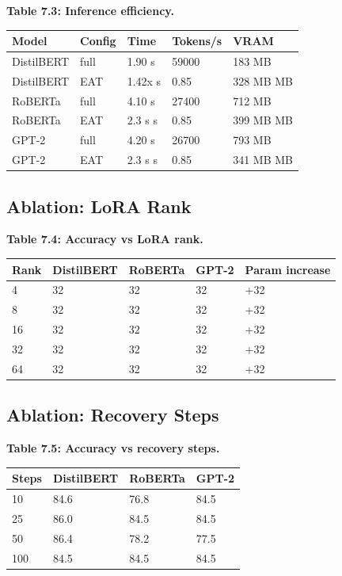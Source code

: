 \textbf{Table 7.3: Inference efficiency.}

\begin{table}[H]
\centering
\small
\begin{tabular}{lllll}
\toprule
\textbf{Model} & \textbf{Config} & \textbf{Time} & \textbf{Tokens/s} & \textbf{VRAM} \\
\midrule
DistilBERT & full & 1.90 s & 59000 & 183 MB \\
DistilBERT & EAT & 1.42x s & 0.85 & 328 MB MB \\
RoBERTa & full & 4.10 s & 27400 & 712 MB \\
RoBERTa & EAT & 2.3 s s & 0.85 & 399 MB MB \\
GPT-2 & full & 4.20 s & 26700 & 793 MB \\
GPT-2 & EAT & 2.3 s s & 0.85 & 341 MB MB \\
\bottomrule
\end{tabular}
\end{table}

\subsection{Ablation: LoRA Rank}

\textbf{Table 7.4: Accuracy vs LoRA rank.}

\begin{table}[H]
\centering
\small
\begin{tabular}{lllll}
\toprule
\textbf{Rank} & \textbf{DistilBERT} & \textbf{RoBERTa} & \textbf{GPT-2} & \textbf{Param increase} \\
\midrule
4 & 32 & 32 & 32 & +32 \\
8 & 32 & 32 & 32 & +32 \\
16 & 32 & 32 & 32 & +32 \\
32 & 32 & 32 & 32 & +32 \\
64 & 32 & 32 & 32 & +32 \\
\bottomrule
\end{tabular}
\end{table}

\subsection{Ablation: Recovery Steps}

\textbf{Table 7.5: Accuracy vs recovery steps.}

\begin{table}[H]
\centering
\small
\begin{tabular}{llll}
\toprule
\textbf{Steps} & \textbf{DistilBERT} & \textbf{RoBERTa} & \textbf{GPT-2} \\
\midrule
10 & 84.6 & 76.8 & 84.5 \\
25 & 86.0 & 84.5 & 84.5 \\
50 & 86.4 & 78.2 & 77.5 \\
100 & 84.5 & 84.5 & 84.5 \\
\bottomrule
\end{tabular}
\end{table}

